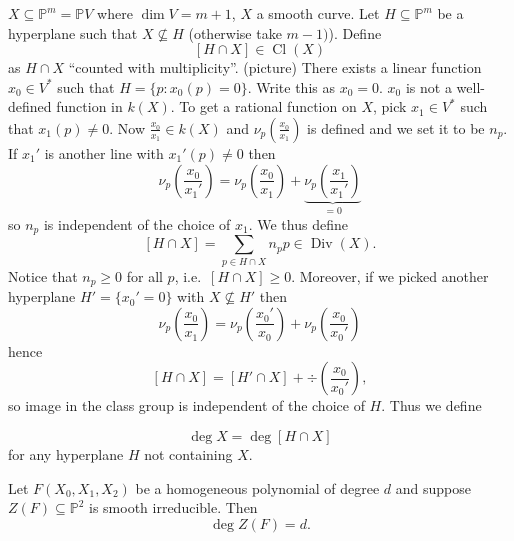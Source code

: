 \documentclass[a4paper]{article}
\DeclareMathOperator{\Cl}{Cl}
\renewcommand*{\P}{\mathbb{P}}
\DeclareMathOperator{\Div}{Div} %
\begin{document}
\(X \subseteq \P^m = \P V\) where \(\dim V = m + 1\), \(X\) a smooth curve. Let \(H \subseteq \P^m\) be a hyperplane such that \(X \nsubseteq H\) (otherwise take \(m - 1)\)). Define
\[
  [H \cap X] \in \Cl(X)
\]
as \(H \cap X\) ``counted with multiplicity''. (picture) There exists a linear function \(x_0 \in V^*\) such that \(H = \{p: x_0(p) = 0\}\). Write this as \(x_0 = 0\). \(x_0\) is not a well-defined function in \(k(X)\). To get a rational function on \(X\), pick \(x_1 \in V^*\) such that \(x_1(p) \neq 0\). Now \(\frac{x_0}{x_1} \in k(X)\) and \(\nu_p(\frac{x_0}{x_1})\) is defined and we set it to be \(n_p\). If \(x_1'\) is another line with \(x_1'(p) \neq 0\) then
\[
  \nu_p(\frac{x_0}{x_1'}) = \nu_p(\frac{x_0}{x_1}) + \underbrace{\nu_p(\frac{x_1}{x_1'})}_{= 0}
\]
so \(n_p\) is independent of the choice of \(x_1\). We thus define
\[
  [H \cap X] = \sum_{p \in H \cap X} n_p p \in \Div(X).
\]
Notice that \(n_p \geq 0\) for all \(p\), i.e.\ \([H \cap X] \geq 0\). Moreover, if we picked another hyperplane \(H' = \{x_0' = 0\}\) with \(X \nsubseteq H'\) then
\[
  \nu_p(\frac{x_0}{x_1}) = \nu_p(\frac{x_0'}{x_0}) + \nu_p(\frac{x_0}{x_0'})
\]
hence
\[
  [H \cap X] = [H' \cap X] + \div (\frac{x_0}{x_0'}),
\]
so image in the class group is independent of the choice of \(H\). Thus we define
\begin{definition}
  \[
    \deg X = \deg [H \cap X]
  \]
  for any hyperplane \(H\) not containing \(X\).
\end{definition}

\begin{theorem}
  Let \(F(X_0, X_1, X_2)\) be a homogeneous polynomial of degree \(d\) and suppose \(Z(F) \subseteq \P^2\) is smooth irreducible. Then
  \[
    \deg Z(F) = d.
  \]
\end{theorem}
\end{document}
